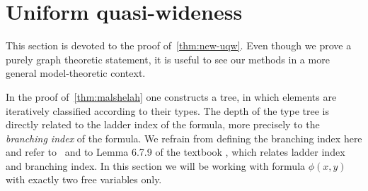 \section{Uniform quasi-wideness}\label{sec:uqw}

This section is devoted to the proof of~\cref{thm:new-uqw}. 
Even though we prove a purely graph theoretic statement, 
it is useful to see our methods in a more general model-theoretic context. 


     


In the proof of~\cref{thm:malshelah} one constructs a tree, in which
elements are iteratively classified according to their types. The depth of 
the type tree is directly related to the ladder index of the formula, 
more precisely to the \emph{branching index} of the formula. We refrain
from defining the branching index here and refer to~\cite{malliaris2014regularity}
and to Lemma 6.7.9 of the textbook \cite{hodges1993model}, which relates
ladder index and branching index. In this section we will be working with 
formula $\phi(x,y)$ with exactly two free variables only. 

